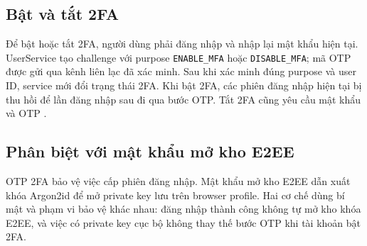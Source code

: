 \subsection{Bật và tắt 2FA}
Để bật hoặc tắt 2FA, người dùng phải đăng nhập và nhập lại mật khẩu hiện tại. UserService tạo challenge với purpose \texttt{ENABLE\_MFA} hoặc \texttt{DISABLE\_MFA}; mã OTP được gửi qua kênh liên lạc đã xác minh. Sau khi xác minh đúng purpose và user ID, service mới đổi trạng thái 2FA. Khi bật 2FA, các phiên đăng nhập hiện tại bị thu hồi để lần đăng nhập sau đi qua bước OTP. Tắt 2FA cũng yêu cầu mật khẩu và OTP \cite{twofa}.

\subsection{Phân biệt với mật khẩu mở kho E2EE}
OTP 2FA bảo vệ việc cấp phiên đăng nhập. Mật khẩu mở kho E2EE dẫn xuất khóa Argon2id để mở private key lưu trên browser profile. Hai cơ chế dùng bí mật và phạm vi bảo vệ khác nhau: đăng nhập thành công không tự mở kho khóa E2EE, và việc có private key cục bộ không thay thế bước OTP khi tài khoản bật 2FA.

